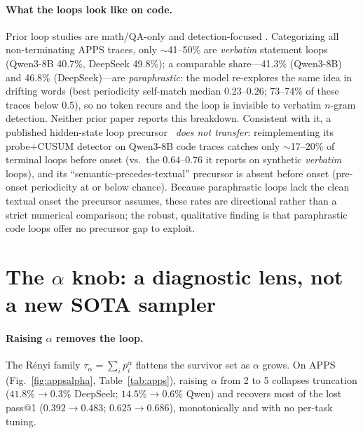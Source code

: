 \documentclass[11pt]{article}                       %
\newcommand{\tsum}{\ensuremath{\textstyle\sum}}
\begin{document}
\paragraph{What the loops look like on code.} Prior loop studies are math/QA-only and detection-focused
\citep{duan2026circular,xie2025wordsalad}. Categorizing all non-terminating APPS traces, only
$\sim$41--50\% are \emph{verbatim} statement loops (Qwen3-8B 40.7\%, DeepSeek 49.8\%); a comparable
share---41.3\% (Qwen3-8B) and 46.8\% (DeepSeek)---are \emph{paraphrastic}: the model re-explores the
same idea in drifting words (best periodicity self-match median $0.23$--$0.26$; 73--74\% of these
traces below $0.5$), so no token recurs and the loop is invisible to verbatim $n$-gram detection.
Neither prior paper reports this breakdown. Consistent with it, a published hidden-state loop
precursor~\citep{duan2026circular} \emph{does not transfer}: reimplementing its probe+CUSUM detector on
Qwen3-8B code traces catches only $\sim$17--20\% of terminal loops before onset (vs.\ the
$0.64$--$0.76$ it reports on synthetic \emph{verbatim} loops), and its ``semantic-precedes-textual''
precursor is absent before onset (pre-onset periodicity at or below chance). Because paraphrastic loops
lack the clean textual onset the precursor assumes, these rates are directional rather than a strict
numerical comparison; the robust, qualitative finding is that paraphrastic code loops offer no
precursor gap to exploit.

\section{The $\alpha$ knob: a diagnostic lens, not a new SOTA sampler}\label{sec:alpha}
\paragraph{Raising $\alpha$ removes the loop.} The R\'enyi family $\tau_\alpha=\tsum_i p_i^\alpha$
flattens the survivor set as $\alpha$ grows. On APPS (Fig.~\ref{fig:appsalpha}, Table~\ref{tab:apps}),
raising $\alpha$ from 2 to 5 collapses truncation ($41.8\%\!\to\!0.3\%$ DeepSeek; $14.5\%\!\to\!0.6\%$
Qwen) and recovers most of the lost pass@1 ($0.392\!\to\!0.483$; $0.625\!\to\!0.686$), monotonically
and with no per-task tuning.
\end{document}
